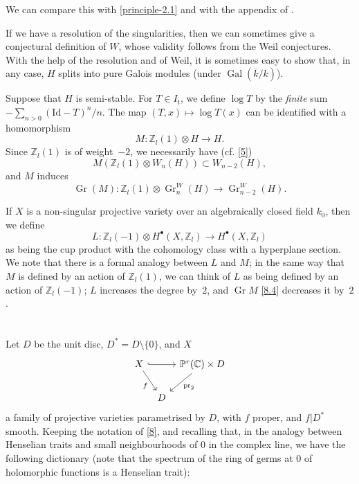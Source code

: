 \documentclass{article}
\theoremstyle{plain}
\theoremstyle{definition}
\newenvironment{env}[1]
    {\renewcommand\theinnercustomenv{#1}\innercustomenv}
    {\endinnercustomenv}
\newcommand{\ZZ}{\mathbb{Z}}
\newcommand{\CC}{\mathbb{C}}
\newcommand{\PP}{\mathbb{P}}
\newcommand{\Id}{\mathrm{Id}}
\DeclareMathOperator{\Gr}{Gr}
\DeclareMathOperator{\Gal}{Gal}
\newcommand{\oldpage}[1]{\marginpar{\footnotesize$\Big\vert$ \textit{p.~#1}}}
\begin{document}
We can compare this with \cref{principle-2.1} and with the appendix of \cite{4}.

If we have a resolution of the singularities, then we can sometimes give a conjectural definition of $W$, whose validity follows from the Weil conjectures.
With the help of the resolution and of Weil, it is sometimes easy to show that, in any case, $H$ splits into pure Galois modules (under $\Gal(\overline{k}/k)$).

Suppose that $H$ is semi-stable.
For $T\in I_t$, we define $\log T$ by the \emph{finite} sum $-\sum_{n>0}(\Id-T)^n/n$.
The map $(T,x)\mapsto\log T(x)$ can be identified with a homomorphism
\[
\label{8.2}
  M\colon \ZZ_l(1)\otimes H \to H.
\tag{8.2}
\]
Since $\ZZ_l(1)$ is of weight~$-2$, we necessarily have (cf. \cref{5})
\[
\label{8.3}
  M(\ZZ_l(1)\otimes W_n(H)) \subset W_{n-2}(H),
\tag{8.3}
\]
and $M$ induces
\[
\label{8.4}
  \Gr(M)\colon \ZZ_l(1)\otimes\Gr_n^W(H) \to \Gr_{n-2}^W(H).
\tag{8.4}
\]

\oldpage{429}
\begin{env}{8.5}
  If $X$ is a non-singular projective variety over an algebraically closed field $k_0$, then we define
  \[
    L\colon \ZZ_l(-1)\otimes H^\bullet(X,\ZZ_l) \to H^\bullet(X,\ZZ_l)
  \]
  as being the cup product with the cohomology class with a hyperplane section.
  We note that there is a formal analogy between $L$ and $M$;
  in the same way that $M$ is defined by an action of $\ZZ_l(1)$, we can think of $L$ as being defined by an action of $\ZZ_l(-1)$;
  $L$ increases the degree by~$2$, and $\Gr M$ \cref{8.4} decreases it by~$2$.
\end{env}


\section{}
\label{9}

Let $D$ be the unit disc, $D^*=D\setminus\{0\}$, and $X$
\[
  \begin{tikzcd}[column sep=tiny]
    X \ar[rr,hook] \ar[dr,swap,"f"]
    && \PP^r(\CC)\times D \ar[dl,"\mathrm{pr}_2"]
  \\&D&
  \end{tikzcd}
\]
a family of projective varieties parametrised by $D$, with $f$ proper, and $f|D^*$ smooth.
Keeping the notation of \cref{8}, and recalling that, in the analogy between Henselian traits and small neighbourhoods of $0$ in the complex line, we have the following dictionary (note that the spectrum of the ring of germs at $0$ of holomorphic functions is a Henselian trait):
\end{document}

